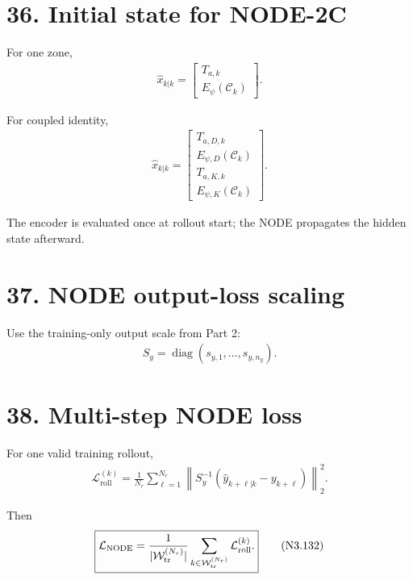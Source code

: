 \documentclass[11pt]{article}
\begin{document}
\section*{36. Initial state for NODE-2C}

For one zone,
\begin{align}
\boxed{
\widehat x_{k|k}
=
\begin{bmatrix}
T_{a,k}\\
E_\psi(\mathcal C_k)
\end{bmatrix}.
}
\tag{N3.128}
\end{align}

For coupled identity,
\begin{align}
\boxed{
\widehat x_{k|k}
=
\begin{bmatrix}
T_{a,D,k}\\
E_{\psi,D}(\mathcal C_k)\\
T_{a,K,k}\\
E_{\psi,K}(\mathcal C_k)
\end{bmatrix}.
}
\tag{N3.129}
\end{align}

The encoder is evaluated once at rollout start; the NODE propagates the hidden state afterward.

\section*{37. NODE output-loss scaling}

Use the training-only output scale from Part 2:
\begin{align}
\boxed{
S_y=\operatorname{diag}(s_{y,1},\ldots,s_{y,n_y}).
}
\tag{N3.130}
\end{align}

\section*{38. Multi-step NODE loss}

For one valid training rollout,
\begin{align}
\boxed{
\mathcal L_{\mathrm{roll}}^{(k)}
=
\frac{1}{N_r}
\sum_{\ell=1}^{N_r}
\left\|
S_y^{-1}
(\widehat y_{k+\ell|k}-y_{k+\ell})
\right\|_2^2.
}
\tag{N3.131}
\end{align}

Then
\begin{align}
\boxed{
\mathcal L_{\mathrm{NODE}}
=
\frac{1}{|\mathcal W_{\rm tr}^{(N_r)}|}
\sum_{k\in\mathcal W_{\rm tr}^{(N_r)}}
\mathcal L_{\mathrm{roll}}^{(k)}.
}
\tag{N3.132}
\end{align}
\end{document}
